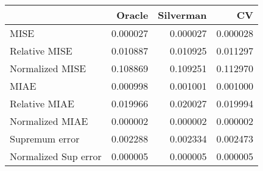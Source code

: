 \begin{tabular}{lrrr}
  \toprule
 & Oracle & Silverman & CV \\ 
  \midrule
MISE & 0.000027 & 0.000027 & 0.000028 \\ 
  Relative MISE & 0.010887 & 0.010925 & 0.011297 \\ 
  Normalized MISE & 0.108869 & 0.109251 & 0.112970 \\ 
  MIAE & 0.000998 & 0.001001 & 0.001000 \\ 
  Relative MIAE & 0.019966 & 0.020027 & 0.019994 \\ 
  Normalized MIAE & 0.000002 & 0.000002 & 0.000002 \\ 
  Supremum error & 0.002288 & 0.002334 & 0.002473 \\ 
  Normalized Sup error & 0.000005 & 0.000005 & 0.000005 \\ 
   \bottomrule
\end{tabular}
